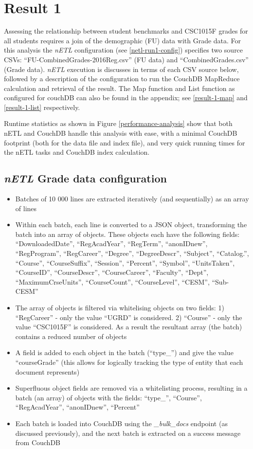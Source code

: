 \section{Result 1}
Assessing the relationship between student benchmarks and CSC1015F grades for all students requires a join of the demographic (FU) data with Grade data. For this analysis the \textit{nETL} configuration (see \ref{netl-run1-config}) specifies two source CSVs: ``FU-CombinedGrades-2016Reg.csv'' (FU data) and ``CombinedGrades.csv'' (Grade data). \textit{nETL} execution is discusses in terms of each CSV source below, followed by a description of the configuration to run the CouchDB MapReduce calculation and retrieval of the result. The Map function and List function as configured for couchDB can also be found in the appendix; see \ref{result-1-map} and \ref{result-1-list} respectively.

Runtime statistics as shown in Figure \ref{performance-analysis} show that both nETL and CouchDB handle this analysis with ease, with a minimal CouchDB footprint (both for the data file and index file), and very quick running times for the nETL tasks and CouchDB index calculation.

\subsection*{\textit{nETL} Grade data configuration}
\begin{itemize}
    \item Batches of 10 000 lines are extracted iteratively (and sequentially) as an array of lines
    \item Within each batch, each line is converted to a JSON object, transforming the batch into an array of objects. These objects each have the following fields: ``DownloadedDate'', ``RegAcadYear'', ``RegTerm'', ``anonIDnew'', ``RegProgram'', ``RegCareer'', ``Degree'', ``DegreeDescr'', ``Subject'', ``Catalog.'', ``Course'', ``CourseSuffix'', ``Session'', ``Percent'', ``Symbol'', ``UnitsTaken'', ``CourseID'', ``CourseDescr'', ``CourseCareer'', ``Faculty'', ``Dept'', ``MaximumCrseUnits'', ``CourseCount'', ``CourseLevel'', ``CESM'', ``Sub-CESM''
    \item The array of objects is filtered via whitelising objects on two fields: 1) ``RegCareer'' - only the value ``UGRD'' is considered. 2) ``Course'' - only the value ``CSC1015F'' is considered. As a result the resultant array (the batch) contains a reduced number of objects
    \item A field is added to each object in the batch (``type\_'') and give the value ``courseGrade'' (this allows for logically tracking the type of entity that each document represents)
    \item Superfluous object fields are removed via a whitelisting process, resulting in a batch (an array) of objects with the fields: ``type\_'', ``Course'', ``RegAcadYear'', ``anonIDnew'', ``Percent''
    \item Each batch is loaded into CouchDB using the \textit{\_bulk\_docs} endpoint (as discussed previously), and the next batch is extracted on a success message from CouchDB
\end{itemize}


